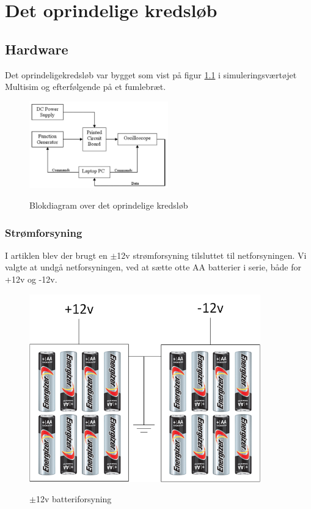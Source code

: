\chapter{Det oprindelige kredsløb}
\section{Hardware}

Det oprindeligekredsløb var bygget som vist på figur \ref{fig:oprindeligebd} i simuleringsværtøjet Multisim og efterfølgende på et fumlebræt. 

\begin{figure}[H]
\centering
{\includegraphics[width=6cm]
{Figure/oprindeligebd}}
\caption{Blokdiagram over det oprindelige kredsløb\cite{Aroom2009}}
\label{fig:oprindeligebd}
\end{figure}

\subsection{Strømforsyning}
I artiklen \cite{Aroom2009} blev der brugt en $\pm$12v strømforsyning tilsluttet til netforsyningen. Vi valgte at undgå netforsyningen, ved at sætte otte AA batterier i serie, både for +12v og -12v.

\begin{figure}[H]
\centering
{\includegraphics[width=10cm]
{Figure/12vbatteri}}
\caption{$\pm$12v batteriforsyning}
\label{fig:12vbatteri}
\end{figure}

